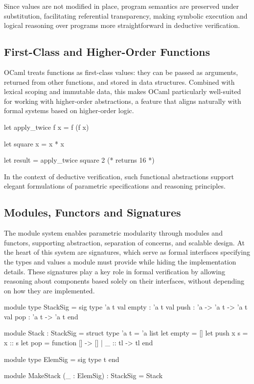 Since values are not modified in place, program semantics are preserved under substitution, facilitating referential transparency, 
making symbolic execution and logical reasoning over programs more straightforward in deductive verification.

\subsection{First-Class and Higher-Order Functions}

OCaml treats functions as first-class values: they can be passed as arguments, returned from other functions, 
and stored in data structures. Combined with lexical scoping and immutable data, this makes OCaml particularly 
well-suited for working with higher-order abstractions, a feature that aligns naturally with formal systems based on 
higher-order logic.

\begin{ocamlenv}
  let apply_twice f x = f (f x)

  let square x = x * x

  let result = apply_twice square 2  (* returns 16 *)
\end{ocamlenv}

In the context of deductive verification, such functional abstractions support elegant formulations of parametric specifications 
and reasoning principles.

\subsection{Modules, Functors and Signatures}

The module system enables parametric modularity through modules and functors, supporting abstraction, separation of concerns, and 
scalable design. At the heart of this system are signatures, which serve as formal interfaces specifying the types and values a 
module must provide while hiding the implementation details. These signatures play a key role in formal verification by allowing 
reasoning about components based solely on their interfaces, without depending on how they are implemented.

\begin{ocamlenv}
  module type StackSig = sig
    type 'a t
    val empty : 'a t
    val push : 'a -> 'a t -> 'a t
    val pop : 'a t -> 'a t
  end

  module Stack : StackSig = struct
    type 'a t = 'a list
    let empty = []
    let push x s = x :: s
    let pop = function [] -> [] | _ :: tl -> tl
  end

  module type ElemSig = sig type t end

  module MakeStack (_ : ElemSig) : StackSig = Stack
\end{ocamlenv}

